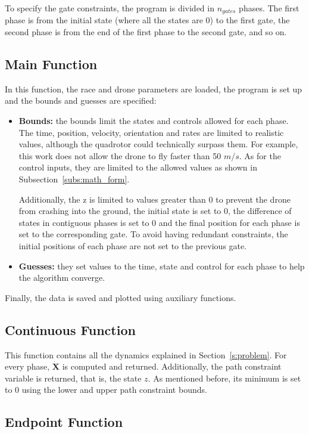 \documentclass[letterpaper, 10 pt, conference]{ieeeconf}  %
\begin{document}
To specify the gate constraints, the program is divided in $n_{gates}$ phases. The first phase is from the initial state (where all the states are 0) to the first gate, the second phase is from the end of the first phase to the second gate, and so on.

\subsection{Main Function}
In this function, the race and drone parameters are loaded, the program is set up and the bounds and guesses are specified:
\begin{itemize}
	\item \textbf{Bounds:} the bounds limit the states and controls allowed for each phase. The time, position, velocity, orientation and rates are limited to realistic values, although the quadrotor could technically surpass them. For example, this work does not allow the drone to fly faster than 50 $m/s$. As for the control inputs, they are limited to the allowed values as shown in Subsection~\ref{subs:math_form}.
	
	Additionally, the z is limited to values greater than 0 to prevent the drone from crashing into the ground, the initial state is set to 0, the difference of states in contiguous phases is set to 0 and the final position for each phase is set to the corresponding gate. To avoid having redundant constraints, the initial positions of each phase are not set to the previous gate.
	\item \textbf{Guesses:} they set values to the time, state and control for each phase to help the algorithm converge.
\end{itemize}

Finally, the data is saved and plotted using auxiliary functions.

\subsection{Continuous Function}

This function contains all the dynamics explained in Section~\ref{s:problem}. For every phase, $\bm{\dot{X}}$ is computed and returned. Additionally, the path constraint variable is returned, that is, the state $z$. As mentioned before, its minimum is set to 0 using the lower and upper path constraint bounds.

\subsection{Endpoint Function}
\end{document}
